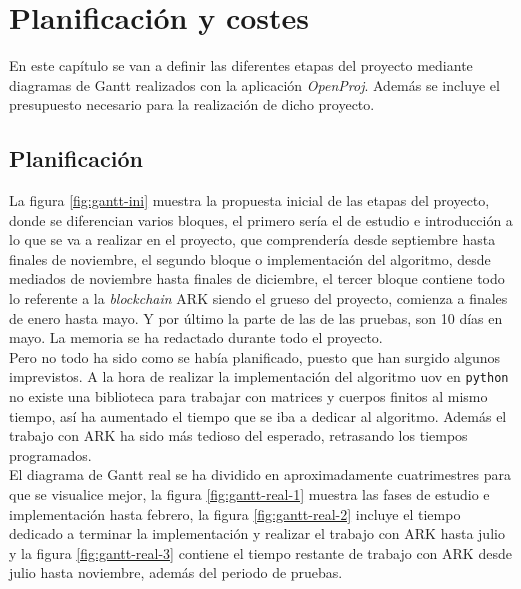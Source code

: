 \chapter{Planificación y costes}


En este capítulo se van a definir las diferentes etapas del proyecto mediante diagramas de Gantt realizados con la aplicación \textit{OpenProj}. Además se incluye el presupuesto necesario para la realización de dicho proyecto.

\section{Planificación}

La figura \ref{fig:gantt-ini} muestra la propuesta inicial de las etapas del proyecto, donde se diferencian varios bloques, el primero sería el de estudio e introducción a lo que se va a realizar en el proyecto, que comprendería desde septiembre hasta finales de noviembre, el segundo bloque o implementación del algoritmo, desde mediados de noviembre hasta finales de diciembre, el tercer bloque contiene todo lo referente a la \textit{blockchain} ARK siendo el grueso del proyecto, comienza a finales de enero hasta mayo. Y por último la parte de las de las pruebas, son 10 días en mayo. La memoria se ha redactado durante todo el proyecto.\\

Pero no todo ha sido como se había planificado, puesto que han surgido algunos imprevistos. A la hora de realizar la implementación del algoritmo \acrshort{uov} en \texttt{python} no existe una biblioteca para trabajar con matrices y cuerpos finitos al mismo tiempo, así ha aumentado el tiempo que se iba a dedicar al algoritmo. Además el trabajo con ARK ha sido más tedioso del esperado, retrasando los tiempos programados.\\

El diagrama de Gantt real se ha dividido en aproximadamente cuatrimestres para que se visualice mejor, la figura \ref{fig:gantt-real-1} muestra las fases de estudio e implementación hasta febrero, la figura \ref{fig:gantt-real-2} incluye el tiempo dedicado a terminar la implementación y realizar el trabajo con ARK hasta julio y la figura \ref{fig:gantt-real-3} contiene el tiempo restante de trabajo con ARK desde julio hasta noviembre, además del periodo de pruebas.


